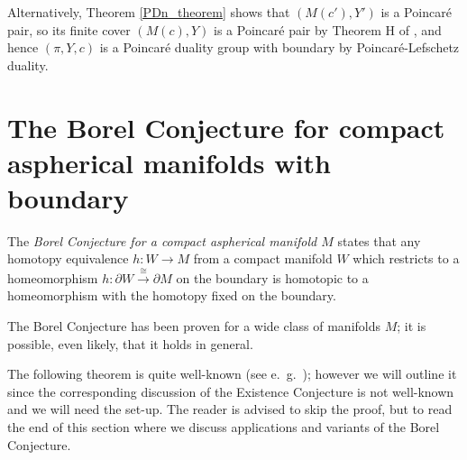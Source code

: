 \documentclass[12pt]{amsart}
\theoremstyle{definition}
\begin{document}
Alternatively, Theorem  \ref{PDn_theorem} shows that $(M(c'),Y')$ is a Poincar\'e pair, so its finite cover $(M(c),Y)$ is a Poincar\'e pair by Theorem H of \cite{KQS}, and hence $(\pi,Y,c)$  is a Poincar\'e duality group with boundary by Poincar\'e-Lefschetz duality.

 
 
 

\section{The Borel Conjecture for compact aspherical manifolds with boundary}  \label{uniqueness}

  

The {\em Borel Conjecture for a compact aspherical manifold $M$} states that any homotopy equivalence $h : W \to M$ from a compact manifold $W$ which restricts to a homeomorphism $h : \partial W \xrightarrow{\cong} \partial M$ on the boundary is homotopic to a homeomorphism with the homotopy fixed on the boundary.  

The Borel Conjecture has been proven for a wide class of manifolds $M$; it is possible, even likely, that it holds in general.   

The following theorem is quite well-known (see e.~g.~\cite{W23}); however we will outline it since the corresponding discussion of the  Existence Conjecture is not well-known and we will need the set-up.   The reader is advised to skip the proof, but to read the end of this section where we discuss applications and variants of the Borel Conjecture.
\end{document}
